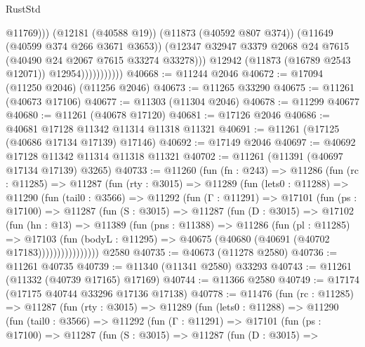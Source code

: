 \begin{lexlean}{RustStd}
\begin{coremodule}
                                  @11769)))
                            (@12181 (@40588 @19))
                            (@11873 (@40592 @807 @374))
                            (@11649 (@40599 @374 @266 @3671 @3653))
                            (@12347
                              @32947
                              @3379
                              @2068
                              @24
                              @7615
                              (@40490 @24 @2067 @7615 @33274 @33278)))
                          @12942
                          (@11873 (@16789 @2543 @12071))
                          @12954)))))))))))
@40668 := @11244 @2046
@40672 := @17094 (@11250 @2046) (@11256 @2046)
@40673 := @11265 @33290
@40675 := @11261 (@40673 @17106)
@40677 := @11303 (@11304 @2046)
@40678 := @11299 @40677
@40680 := @11261 (@40678 @17120)
@40681 := @17126 @2046
@40686 := @40681 @17128 @11342 @11314 @11318 @11321
@40691 := @11261 (@17125 (@40686 @17134 @17139) @17146)
@40692 := @17149 @2046
@40697 := @40692 @17128 @11342 @11314 @11318 @11321
@40702 := @11261 (@11391 (@40697 @17134 @17139) @3265)
@40733 := @11260
    (fun (fn : @243) =>
    @11286
      (fun (rc : @11285) =>
      @11287
        (fun (rty : @3015) =>
        @11289
          (fun (lets0 : @11288) =>
          @11290
            (fun (tail0 : @3566) =>
            @11292
              (fun (Γ : @11291) =>
              @17101
                (fun (ps : @17100) =>
                @11287
                  (fun (S : @3015) =>
                  @11287
                    (fun (D : @3015) =>
                    @17102
                      (fun (hn : @13) =>
                      @11389
                        (fun (pns : @11388) =>
                        @11286
                          (fun (pl : @11285) =>
                          @17103
                            (fun (bodyL : @11295) =>
                            @40675 (@40680 (@40691 (@40702 @17183))))))))))))))))
    @2580
@40735 := @40673 (@11278 @2580)
@40736 := @11261 @40735
@40739 := @11340 (@11341 @2580) @33293
@40743 := @11261 (@11332 (@40739 @17165) @17169)
@40744 := @11366 @2580
@40749 := @17174 (@17175 @40744 @33296 @17136 @17138)
@40778 := @11476
    (fun (rc : @11285) =>
    @11287
      (fun (rty : @3015) =>
      @11289
        (fun (lets0 : @11288) =>
        @11290
          (fun (tail0 : @3566) =>
          @11292
            (fun (Γ : @11291) =>
            @17101
              (fun (ps : @17100) =>
              @11287
                (fun (S : @3015) =>
                @11287
                  (fun (D : @3015) =>

\end{coremodule}
\end{lexlean}
